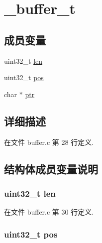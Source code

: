 \hypertarget{struct__buffer__t}{}\section{\+\_\+buffer\+\_\+t}
\label{struct__buffer__t}
\subsection*{成员变量}
\begin{DoxyCompactItemize}
\item 
uint32\+\_\+t \hyperlink{struct__buffer__t_a96bbf959016e4411c9e6b9812a8be60a}{len}
\item 
uint32\+\_\+t \hyperlink{struct__buffer__t_af09611129dedc89382e4d7b6427bdb27}{pos}
\item 
char $\ast$ \hyperlink{struct__buffer__t_a935adc2e417a61d7eb6f04efb18ba031}{ptr}
\end{DoxyCompactItemize}


\subsection{详细描述}


在文件 buffer.\+c 第 28 行定义.



\subsection{结构体成员变量说明}
\hypertarget{struct__buffer__t_a96bbf959016e4411c9e6b9812a8be60a}{}
\subsubsection[{len}]{\setlength{\rightskip}{0pt plus 5cm}uint32\+\_\+t len}\label{struct__buffer__t_a96bbf959016e4411c9e6b9812a8be60a}


在文件 buffer.\+c 第 30 行定义.

\hypertarget{struct__buffer__t_af09611129dedc89382e4d7b6427bdb27}{}
\subsubsection[{pos}]{\setlength{\rightskip}{0pt plus 5cm}uint32\+\_\+t pos}\label{struct__buffer__t_af09611129dedc89382e4d7b6427bdb27}


